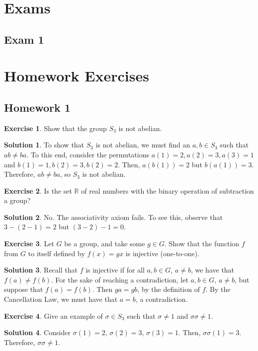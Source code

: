 \documentclass[12pt]{article}
\theoremstyle{definition}
\newtheorem{exercise}{Exercise}
\theoremstyle{definition}
\newtheorem{solution}{Solution}
\begin{document}
\section{Exams}
\subsection{Exam 1}

\section{Homework Exercises}
\subsection{Homework 1}
\begin{exercise}
Show that the group $S_3$ is not abelian. 
\end{exercise}
\begin{solution}
To show that $S_3$ is not abelian, we must find an $a,b \in S_3$ such that $ab \neq ba$. To this end, consider the permutations $a(1) = 2, a(2) = 3, a(3) = 1$ and $b(1) = 1, b(2) = 3, b(2) = 2.$ Then, $a(b(1))= 2$ but $b(a(1)) = 3$. Therefore, $ab \neq ba$, so $S_3$ is not abelian.
\end{solution}

\begin{exercise}
Is the set $\mathbb{R}$ of real numbers with the binary operation of subtraction a group?
\end{exercise}
\begin{solution}
No. The associativity axiom fails. To see this, observe that $3 - (2 - 1) = 2$ but $(3 - 2) - 1 = 0$. 
\end{solution}

\begin{exercise}
Let $G$ be a group, and take some $g \in G$. Show that the function $f$ from $G$ to itself defined by $f(x)=gx$ is injective (one-to-one).
\end{exercise} 
\begin{solution}
Recall that $f$ is injective if for all $a, b \in G$, $a \neq b$, we have that $f(a) \neq f(b)$. For the sake of reaching a contradiction, let $a,b \in G$, $a \neq b$, but suppose that $f(a) = f(b)$. Then $ga = gb$, by the definition of $f$. By the Cancellation Law, we must have that $a = b$, a contradiction.
\end{solution}

\begin{exercise}
Give an example of $\sigma \in S_3$ such that $\sigma \neq 1$ and $\sigma \sigma \neq 1$.
\end{exercise}
\begin{solution}
Consider $\sigma(1) = 2$, $\sigma(2) = 3$, $\sigma(3) = 1$. Then, $\sigma \sigma(1)=3$. Therefore, $\sigma\sigma \neq 1$.
\end{solution}
\end{document}
